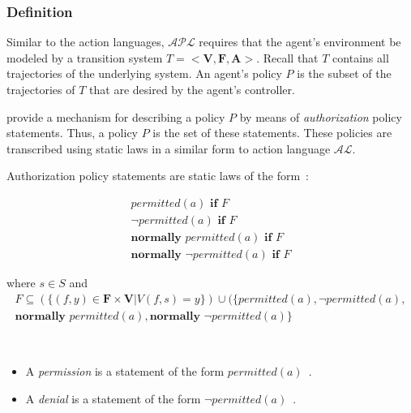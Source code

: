 \subsubsection{Definition}

Similar to the action languages, $\mathcal{APL}$ requires that the agent's environment be modeled by a transition system $T=<\boldsymbol{V},\boldsymbol{F},\boldsymbol{A}>$.
Recall that $T$ contains all trajectories of the underlying system.
An agent's policy $P$ is the subset of the trajectories of $T$ that are desired by the agent's controller.

\citet{gelfond_authorization_2008} provide a mechanism for describing a policy $P$ by means of \textit{authorization} policy statements.
Thus, a policy $P$ is the set of these statements.
These policies are transcribed using static laws in a similar form to action language $\mathcal{AL}$.

\begin{definition}
    \label{def:authorization_statements}
    Authorization policy statements are static laws of the form~\citep{gelfond_authorization_2008}:

    \begin{gather*}
        permitted\left(a\right) \textbf{ if } F \\
        \neg permitted\left(a\right) \textbf{ if } F \\
        \textbf{normally } permitted(a) \textbf{ if } F \\
        \textbf{normally } \neg permitted(a) \textbf{ if } F
    \end{gather*}

    \noindent
    where
    $s \in S$
    and
    \begin{multline*}
        F\subseteq\left(\{(f, y) \in \boldsymbol{F} \times \boldsymbol{V} | V(f,s)=y\}\right) \cup (\{permitted(a),
        \neg permitted(a), \\
        \textbf{normally } permitted(a),
        \textbf{normally } \neg permitted(a)\}
    \end{multline*}
\end{definition}

\begin{definition}
    \label{def:permission}
    \label{def:denial}
    ~

    \begin{itemize}
        \item A \textit{permission} is a statement of the form $permitted(a)$~\citep{gelfond_authorization_2008}.
        \item A \textit{denial} is a statement of the form $\neg permitted(a)$~\citep{gelfond_authorization_2008}.
    \end{itemize}
\end{definition}

